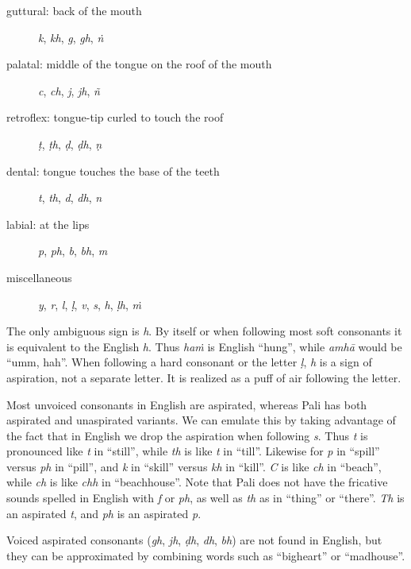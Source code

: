 \documentclass[12pt,openany]{book}%
\begin{document}
\begin{description}%
\item[guttural: back of the mouth] \textit{k}, \textit{kh}, \textit{g}, \textit{gh}, \textit{\textsanskrit{ṅ}}%
\item[palatal: middle of the tongue on the roof of the mouth] \textit{c}, \textit{ch}, \textit{j}, \textit{jh}, \textit{\textsanskrit{ñ}}%
\item[retroflex: tongue-tip curled to touch the roof] \textit{\textsanskrit{ṭ}}, \textit{\textsanskrit{ṭh}}, \textit{\textsanskrit{ḍ}}, \textit{\textsanskrit{ḍh}}, \textit{\textsanskrit{ṇ}}%
\item[dental: tongue touches the base of the teeth] \textit{t}, \textit{th}, \textit{d}, \textit{dh}, \textit{n}%
\item[labial: at the lips] \textit{p}, \textit{ph}, \textit{b}, \textit{bh}, \textit{m}%
\item[miscellaneous] \textit{y}, \textit{r}, \textit{l}, \textit{\textsanskrit{ḷ}}, \textit{v}, \textit{s}, \textit{h}, \textit{\textsanskrit{ḷh}}, \textit{\textsanskrit{ṁ}}%
\end{description}

The only ambiguous sign is \textit{h}. By itself or when following most soft consonants it is equivalent to the English \textit{h}. Thus \textit{\textsanskrit{haṁ}} is English “hung”, while \textit{\textsanskrit{amhā}} would be “umm, hah”. When following a hard consonant or the letter \textit{\textsanskrit{ḷ}}, \textit{h} is a sign of aspiration, not a separate letter. It is realized as a puff of air following the letter.

Most unvoiced consonants in English are aspirated, whereas Pali has both aspirated and unaspirated variants. We can emulate this by taking advantage of the fact that in English we drop the aspiration when following \textit{s}. Thus \textit{t} is pronounced like \textit{t} in “still”, while \textit{th} is like \textit{t} in “till”. Likewise for \textit{p} in “spill” versus \textit{ph} in “pill”, and \textit{k} in “skill” versus \textit{kh} in “kill”. \textit{C} is like \textit{ch} in “beach”, while \textit{ch} is like \textit{chh} in “beachhouse”. Note that Pali does not have the fricative sounds spelled in English with \textit{f} or \textit{ph}, as well as \textit{th} as in “thing” or “there”. \textit{Th} is an aspirated \textit{t}, and \textit{ph} is an aspirated \textit{p}. 

Voiced aspirated consonants (\textit{gh}, \textit{jh}, \textit{\textsanskrit{ḍh}}, \textit{dh}, \textit{bh}) are not found in English, but they can be approximated by combining words such as “bigheart” or “madhouse”.
\end{document}
